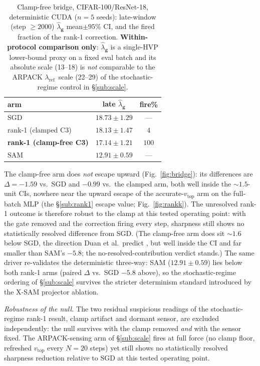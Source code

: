 \documentclass{article}
\theoremstyle{plain}
\theoremstyle{definition}
\theoremstyle{remark}
\newcommand{\lref}{\ensuremath{\lambda_{\mathrm{ref}}}}
\newcommand{\lhatg}{\hat{\lambda}_{\mathbf{g}}}
\newcommand{\RTableTopGap}{%
  \setlength{\abovetopsep}{2pt}%
}
\begin{document}
\begin{table}[!ht]
\centering\small
\caption{Clamp-free bridge, CIFAR-100/ResNet-18, deterministic CUDA ($n{=}5$
seeds): late-window (step $\geq 2000$) $\lhatg$ mean$\pm 95\%$ CI, and the
fired fraction of the rank-1 correction. \textbf{Within-protocol comparison
only}: $\lhatg$ is a single-HVP lower-bound proxy on a fixed eval batch and
its absolute scale (13--18) is \emph{not} comparable to the ARPACK \lref\
scale (22--29) of the stochastic-regime control in \S\ref{sub:scale}.}
\label{tab:bridge}
{\renewcommand{\arraystretch}{1.10}\RTableTopGap
\begin{tabular}{lcc}
\toprule
arm & late $\lhatg$ & fire\% \\
\midrule
SGD & $18.73\pm1.29$ & --- \\
rank-1 (clamped C3) & $18.13\pm1.47$ & $4$ \\
\textbf{rank-1 (clamp-free C3)} & $\mathbf{17.14\pm1.21}$ & $100$ \\
SAM & $12.91\pm0.59$ & --- \\
\bottomrule
\end{tabular}}
\end{table}

The clamp-free arm does \emph{not} escape upward (Fig.~\ref{fig:bridge}): its
differences are $\Delta=-1.59$ vs.\ SGD and $-0.99$ vs.\ the clamped
arm, both well inside the $\sim\!1.5$-unit CIs, nowhere near the
upward escape of the accurate-$v_{\mathrm{top}}$ arm on the
full-batch MLP (the \S\ref{sub:rank1} escape value; Fig.~\ref{fig:rankk}). The unresolved rank-1
outcome is therefore robust to the clamp at this tested operating point: with the gate
removed and the correction firing every step, sharpness still shows no
statistically resolved difference from SGD. (The clamp-free arm does sit $\sim\!1.6$ below
SGD, the direction Duan et al.\ predict \citep{duan2026xsam}, but well
inside the CI and far smaller than SAM's $-5.8$; the no-resolved-contribution
verdict stands.) The same driver re-validates the deterministic
three-way: SAM ($12.91\pm0.59$) lies below both rank-1 arms
(paired $\Delta$ vs.\ SGD $-5.8$ above), so the stochastic-regime ordering of \S\ref{sub:scale} survives
the stricter determinism standard introduced by the X-SAM projector ablation.

\emph{Robustness of the null.} The two residual
suspicious readings of the stochastic-regime rank-1 result, clamp artifact and
dormant sensor, are excluded independently: the null survives
with the clamp removed \emph{and} with the sensor fixed. The ARPACK-sensing
arm of \S\ref{sub:scale} fires at full force (no clamp floor, refreshed
$v_{\mathrm{top}}$ every $N{=}20$ steps) yet still shows no statistically
resolved sharpness reduction relative to SGD at this tested operating point.
\end{document}
